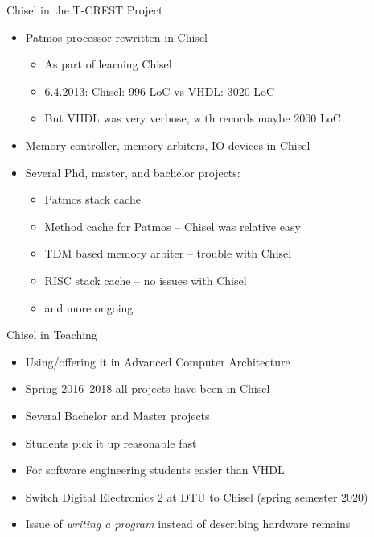 \documentclass[xcolor=pdflatex,dvipsnames,table]{beamer}
\begin{document}
\begin{frame}[fragile]{Chisel in the T-CREST Project}
\begin{itemize}
\item Patmos processor rewritten in Chisel
\begin{itemize}
\item As part of learning Chisel
\item 6.4.2013: Chisel: 996 LoC vs VHDL: 3020 LoC
\item But VHDL was very verbose, with records maybe 2000 LoC
\end{itemize}
\item Memory controller, memory arbiters, IO devices in Chisel
\item Several Phd, master, and bachelor projects:
\begin{itemize}
\item Patmos stack cache
\item Method cache for Patmos -- Chisel was relative easy
\item TDM based memory arbiter -- trouble with Chisel
\item RISC stack cache -- no issues with Chisel
\item and more ongoing 
\end{itemize}
\end{itemize}
\end{frame}

\begin{frame}[fragile]{Chisel in Teaching}
\begin{itemize}
\item Using/offering it in Advanced Computer Architecture
\item Spring 2016--2018 all projects have been in Chisel
\item Several Bachelor and Master projects
\item Students pick it up reasonable fast
\item For software engineering students easier than VHDL
\item Switch Digital Electronics 2 at DTU to Chisel (spring semester 2020)
\item Issue of \emph{writing a program} instead of describing hardware remains
\end{itemize}
\end{frame}
\end{document}
